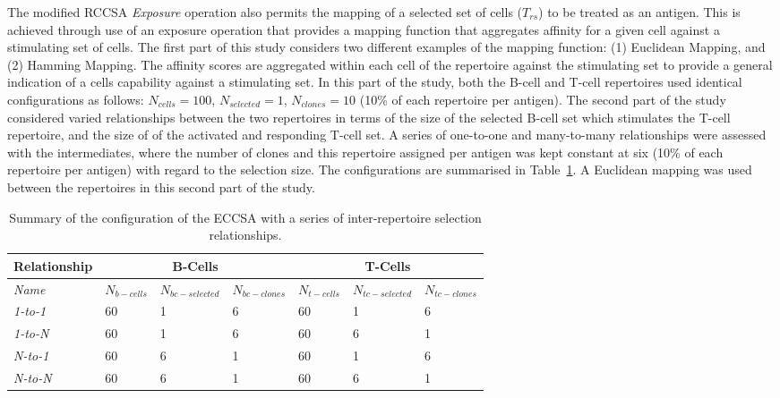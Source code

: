 The modified RCCSA \emph{Exposure} operation also permits the mapping of a selected set of cells ($T_{rs}$) to be treated as an antigen. This is achieved through use of an exposure operation that provides a mapping function that aggregates affinity for a given cell against a stimulating set of cells. The first part of this study considers two different examples of the mapping function: (1) Euclidean Mapping, and (2) Hamming Mapping. The affinity scores are aggregated within each cell of the repertoire against the stimulating set to provide a general indication of a cells capability against a stimulating set. In this part of the study, both the B-cell and T-cell repertoires used identical configurations as follows: $N_{cells}=100$,  $N_{selected}=1$, $N_{clones}=10$ (10\% of each repertoire per antigen).
The second part of the study considered varied relationships between the two repertoires in terms of the size of the selected B-cell set which stimulates the T-cell repertoire, and the size of of the activated and responding T-cell set. A series of one-to-one and many-to-many relationships were assessed with the intermediates, where the number of clones and this repertoire assigned per antigen was kept constant at six (10\% of each repertoire per antigen) with regard to the selection size. The configurations are summarised in Table~\ref{tab:cells:mccsa:mappings:configuration}. A Euclidean mapping was used between the repertoires in this second part of the study.

\begin{table}[htp]
	\centering\small
		\begin{tabular}{lllllll}
		\toprule
		\textbf{Relationship} & \multicolumn{3}{c}{\textbf{B-Cells}} & \multicolumn{3}{c}{\textbf{T-Cells}} \\ 
		\midrule
		\emph{Name} & $N_{b-cells}$ & $N_{bc-selected}$ & $N_{bc-clones}$ & $N_{t-cells}$ & $N_{tc-selected}$ & $N_{tc-clones}$ \\ 
		\toprule
		\emph{1-to-1} & 60 & 1 & 6 & 60 & 1 & 6 \\ 
		\emph{1-to-N} & 60 & 1 & 6 & 60 & 6 & 1 \\ 
		\emph{N-to-1} & 60 & 6 & 1 & 60 & 1 & 6 \\ 
		\emph{N-to-N} & 60 & 6 & 1 & 60 & 6 & 1 \\ 
		\bottomrule
		\end{tabular}
	\caption{Summary of the configuration of the ECCSA with a series of inter-repertoire selection relationships.}
	\label{tab:cells:mccsa:mappings:configuration}
\end{table}

